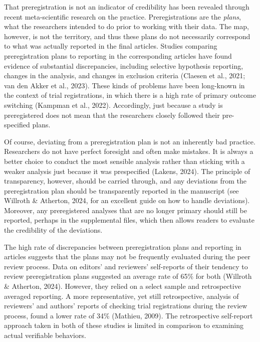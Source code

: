 \documentclass[authordate, meta, issue]{jote-new-article}
\begin{document}
	That preregistration is not an indicator of credibility has been revealed through recent meta-scientific research on the practice. Preregistrations are the \emph{plans}, what the researchers intended to do prior to working with their data. The map, however, is not the territory, and thus these plans do not necessarily correspond to what was actually reported in the final articles. Studies comparing preregistration plans to reporting in the corresponding articles have found evidence of substantial discrepancies, including selective hypothesis reporting, changes in the analysis, and changes in exclusion criteria (Claesen et al., 2021; van den Akker et al., 2023). These kinds of problems have been long-known in the context of trial registrations, in which there is a high rate of primary outcome switching (Kampman et al., 2022). Accordingly, just because a study is preregistered does not mean that the researchers closely followed their pre-specified plans.



	Of course, deviating from a preregistration plan is not an inherently bad practice. Researchers do not have perfect foresight and often make mistakes. It is always a better choice to conduct the most sensible analysis rather than sticking with a weaker analysis just because it was prespecified (Lakens, 2024). The principle of transparency, however, should be carried through, and any deviations from the preregistration plan should be transparently reported in the manuscript (see Willroth \& Atherton, 2024, for an excellent guide on how to handle deviations). Moreover, any preregistered analyses that are no longer primary should still be reported, perhaps in the supplemental files, which then allows readers to evaluate the credibility of the deviations.



	The high rate of discrepancies between preregistration plans and reporting in articles suggests that the plans may not be frequently evaluated during the peer review process. Data on editors' and reviewers' self-reports of their tendency to review preregistration plans suggested an average rate of 65\% for both (Willroth \& Atherton, 2024). However, they relied on a select sample and retrospective averaged reporting. A more representative, yet still retrospective, analysis of reviewers' and authors' reports of checking trial registrations during the review process, found a lower rate of 34\% (Mathieu, 2009). The retrospective self-report approach taken in both of these studies is limited in comparison to examining actual verifiable behaviors.
\end{document}
